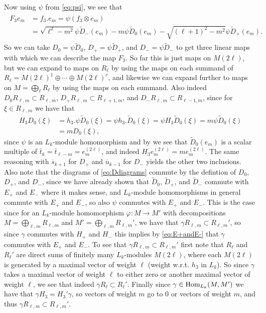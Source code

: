 Now using $\psi$ from \cref{eq:psi}, we see that
\begin{align}\label{eq:F_3action}
  \begin{aligned}
    F_3e_m &= f_3 . e_m = \psi(f_3\otimes e_m) \\
    &= \sqrt{\ell^2-m^2}\psi \widetilde D_-(e_m) - m\psi \widetilde D_0(e_m) - \sqrt{(\ell+1)^2-m^2}\psi \widetilde D_+(e_m).
  \end{aligned}
\end{align}
So we can take $D_0=\psi\widetilde D_0$, $D_+ = \psi\widetilde D_+$, and $D_- = \psi\widetilde D_-$ to get three linear maps with which we can describe the map $F_3$. So far this is just maps on $M(2\ell)$, but we can expand to maps on $R_\ell$ by using the maps on each summand of $R_\ell=M(2\ell)^1 \oplus \dotsb \oplus M(2\ell)^r$, and likewise we can expand further to maps on $M=\bigoplus_\ell R_\ell$ by using the maps on each summand. Also indeed $D_0R_{\ell,m}\subset R_{\ell,m}$, $D_+R_{\ell,m}\subset R_{\ell+1,m}$, and $D_-R_{\ell,m}\subset R_{\ell-1,m}$, since for $\xi\in R_{\ell,m}$ we have that
\begin{align*}
  H_3D_0(\xi) &= h_3 . \psi\widetilde D_0(\xi) = \psi h_3 . \widetilde D_0(\xi) = \psi H_3 \widetilde D_0(\xi) = m\psi \widetilde D_0(\xi) \\
  &= m D_0(\xi),
\end{align*}
since $\psi$ is an $L_k$-module homomorphism and by  we see that $\widetilde D_0(e_m)$ is a scalar multiple of $\overline t_k = \overline t_{\ell-m} = e_m^{(2\ell)}$, and indeed $H_3e_m^{(2\ell)}=me_m^{(2\ell)}$. The same reasoning with $\overline s_{k+1}$ for $D_+$ and $\overline u_{k-1}$ for $D_-$ yields the other two inclusions. Also note that the diagrams of \cref{eq:Ddiagrams} commute by the defintion of $D_0$, $D_+$, and $D_-$, since we have already shown that $\widetilde D_0$, $\widetilde D_+$, and $\widetilde D_-$ commute with $E_+$ and $E_-$ where it makes sense, and $L_k$-module homomorphisms in general commute with $E_+$ and $E_-$, so also $\psi$ commutes with $E_+$ and $E_-$. This is the case since for an $L_k$-module homomorphism $\varphi\colon M\to M'$ with decompositions $M=\bigoplus_{\ell,m} R_{\ell,m}$ and $M'=\bigoplus_{\ell,m} R_{\ell,m}'$, we have that $\gamma R_{\ell,m} \subset R_{\ell,m}'$, so since $\gamma$ commutes with $H_+$ and $H_-$ this implies by \cref{eq:E+andE-} that $\gamma$ commutes with $E_+$ and $E_-$. To see that $\gamma R_{\ell,m}\subset R_{\ell,m}'$ first note that $R_\ell$ and $R_\ell'$ are direct sums of finitely many $L_k$-modules $M(2\ell)$, where each $M(2\ell)$ is generated by a maximal vector of weight $\ell$ (weight w.r.t. $h_3$ in $L_k$). So since $\gamma$ takes a maximal vector of weight $\ell$ to either zero or another maximal vector of weight $\ell$, we see that indeed $\gamma R_\ell \subset R_\ell'$. Finally since $\gamma\in\operatorname{Hom}_{L_k}(M,M')$ we have that $\gamma H_3 = H_3' \gamma$, so vectors of weight $m$ go to $0$ or vectors of weight $m$, and thus $\gamma R_{\ell,m} \subset R_{\ell,m}'$.

